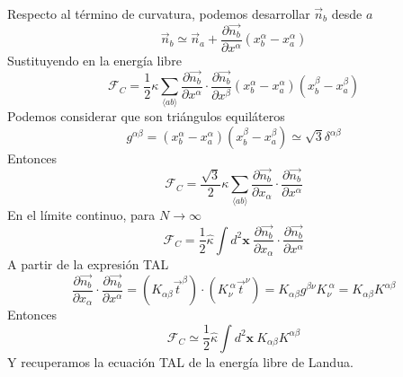 Respecto al término de curvatura, podemos desarrollar $\vec{n}_{b}$ desde $a$
\begin{equation}
\vec{n}_b\simeq\vec{n}_a+\frac{\partial \vec{n_b}}{\partial x^{\alpha}}(x_b^{\alpha}-x_a^{\alpha})
\end{equation}
Sustituyendo en la energía libre
\begin{equation}
\mathcal{F}_C=\frac{1}{2}\kappa\sum_{\langle ab\rangle}\frac{\partial
  \vec{n_b}}{\partial x^{\alpha}}\cdot\frac{\partial \vec{n_b}}{\partial x^{\beta}} (x_b^{\alpha}-x_a^{\alpha})(x_b^{\beta}-x_a^{\beta})
\end{equation}
Podemos considerar que son triángulos equiláteros
\begin{equation}
g^{\alpha\beta}=(x_b^{\alpha}-x_a^{\alpha})(x_b^{\beta}-x_a^{\beta})\simeq
\sqrt{3} \delta^{\alpha\beta}
\end{equation}
Entonces
\begin{equation}
\mathcal{F}_C=\frac{\sqrt{3}}{2}\kappa\sum_{\langle ab\rangle}\frac{\partial
  \vec{n_b}}{\partial x_{\alpha}}\cdot\frac{\partial \vec{n_b}}{\partial x^{\alpha}}
\end{equation}
En el límite continuo, para $N\rightarrow \infty$
\begin{equation}
\mathcal{F}_C=\frac{1}{2}\hat{\kappa}\int d^2\mathbf{x}\ \frac{\partial
  \vec{n_b}}{\partial x_{\alpha}}\cdot\frac{\partial \vec{n_b}}{\partial x^{\alpha}}
\end{equation}
A partir de la expresión TAL
\begin{equation}
\frac{\partial \vec{n_b}}{\partial x_{\alpha}}\cdot\frac{\partial
  \vec{n_b}}{\partial x^{\alpha}}=(K_{\alpha\beta}\vec{t}^{\beta})\cdot(K_{\nu}^{\
  \alpha}\vec{t}^{\nu})=K_{\alpha\beta}g^{\beta\nu}K_{\nu}^{\ \alpha}=K_{\alpha\beta}K^{\alpha\beta}
\end{equation}
Entonces 
\begin{equation}
\mathcal{F}_C\simeq\frac{1}{2}\hat{\kappa}\int d^2\mathbf{x}\ K_{\alpha\beta}K^{\alpha\beta}
\end{equation}
Y recuperamos la ecuación TAL de la energía libre de Landua.

